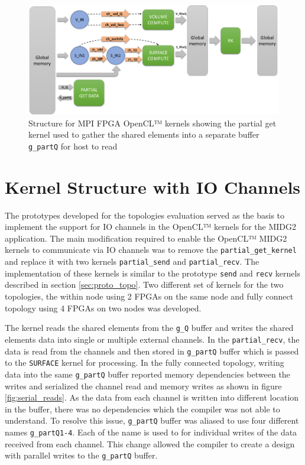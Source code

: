 \begin{figure}%
    \centering
    \includegraphics[width=1.0\textwidth]{images/base_kernstruc}
    \caption{Structure for MPI FPGA OpenCL™ kernels showing the partial get kernel used to gather
     the shared elements into a separate buffer \texttt{g\_partQ} for host to read}
    \label{fig:base_kernstruc}
\end{figure}

\section{Kernel Structure with IO Channels}
\label{sec:struc_iochan}

The prototypes developed for the topologies evaluation served as the basis to implement
the support for IO channels in the OpenCL™ kernels for the MIDG2 application. The main
modification required to enable the OpenCL™ MIDG2 kernels to communicate via IO channels
was to remove the \texttt{partial\_get\_kernel} and replace it with two kernels
\texttt{partial\_send} and \texttt{partial\_recv}. The implementation of these kernels
is similar to the prototype \texttt{send} and \texttt{recv} kernels described in
section \ref{sec:proto_topo}. Two different set of kernels for the two topologies,
the within node using 2 FPGAs on the same node and fully connect topology using
4 FPGAs on two nodes was developed.

The  kernel reads the shared elements from the \texttt{g\_Q} buffer
and writes the shared elements data into single or multiple external channels.
In the \texttt{partial\_recv}, the data is read from the channels and then stored in
\texttt{g\_partQ} buffer which is passed to the \texttt{SURFACE} kernel for processing.
In the fully connected topology, writing data into the same \texttt{g\_partQ} buffer
reported memory dependencies between the writes and serialized the channel read and memory
writes as shown in figure \ref{fig:serial_reads}. As the data from each channel is written
into different location in the buffer, there was no dependencies which the compiler was not
able to understand. To resolve this issue, \texttt{g\_partQ} buffer was aliased to use four
different names \texttt{g\_partQ1-4}. Each of the name is used to for individual writes of
the data received from each channel. This change allowed the compiler to create a design
with parallel writes to the \texttt{g\_partQ} buffer.

